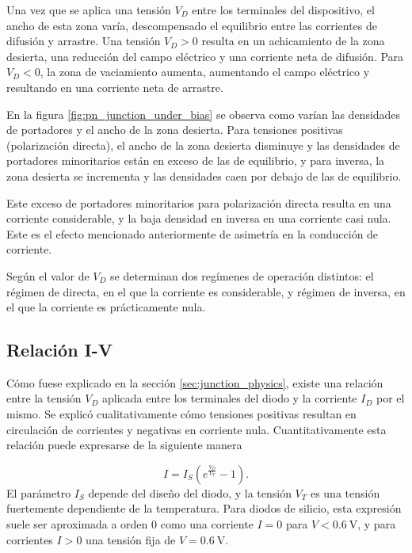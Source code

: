 Una vez que se aplica una tensión $V_D$ entre los terminales del dispositivo, el
ancho de esta zona varía, descompensado el equilibrio entre las corrientes de
difusión y arrastre. Una tensión $V_D > 0$ resulta en un achicamiento de la zona
desierta, una reducción del campo eléctrico y una corriente neta de difusión.
Para $V_D < 0$, la zona de vaciamiento aumenta, aumentando el campo eléctrico y
resultando en una corriente neta de arrastre.

En la figura \ref{fig:pn_junction_under_bias} se observa como varían las
densidades de portadores y el ancho de la zona desierta. Para tensiones
positivas (polarización directa), el ancho de la zona desierta disminuye y las
densidades de portadores minoritarios están en exceso de las de equilibrio, y
para inversa, la zona desierta se incrementa y las densidades caen por debajo de
las de equilibrio.

Este exceso de portadores minoritarios para polarización directa resulta en una
corriente considerable, y la baja densidad en inversa en una corriente casi
nula. Este es el efecto mencionado anteriormente de asimetría en la conducción
de corriente.

Según el valor de $V_D$ se determinan dos regímenes de operación distintos: el
régimen de directa, en el que la corriente es considerable, y régimen de
inversa, en el que la corriente es prácticamente nula.

\subsection{Relación I-V}

Cómo fuese explicado en la sección \ref{sec:junction_physics}, existe una
relación entre la tensión $V_D$ aplicada entre los terminales del diodo y la
corriente $I_D$ por el mismo. Se explicó cualitativamente cómo tensiones
positivas resultan en circulación de corrientes y negativas en corriente nula.
Cuantitativamente esta relación puede expresarse de la siguiente manera
\cite{neamen2012semiconductor}

\begin{equation}
    I = I_S \left( e^{\frac{V_D}{V_T}}-1\right).
\end{equation}
El parámetro $I_S$ depende del diseño del diodo, y la tensión $V_T$ es una
tensión fuertemente dependiente de la temperatura. Para diodos de silicio, esta
expresión suele ser aproximada a orden 0 como una corriente $I=0$ para $V<
\qty{0.6}{\volt}$, y para corrientes $I>0$ una tensión fija de $V =
\qty{0.6}{\volt}$.

